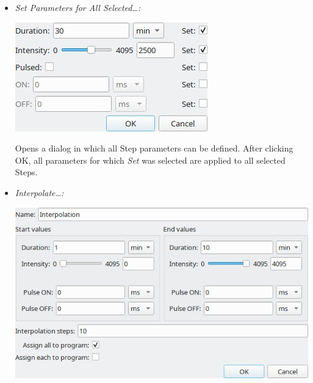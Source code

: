 \begin{itemize}
\item
  \emph{Set Parameters for All Selected\ldots:}

  \includegraphics{images/setallparams.jpg}

  Opens a dialog in which all Step parameters can be defined. After
  clicking OK, all parameters for which \emph{Set} was selected are
  applied to all selected Steps.
\item
  \emph{Interpolate\ldots:}

  \includegraphics{images/interpolation_dialog.jpg}


\end{itemize}
